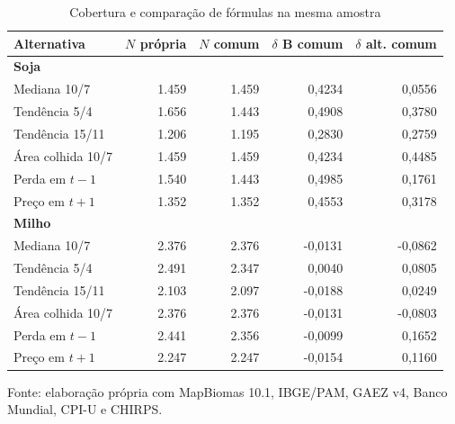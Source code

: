 \begin{table}[htbp]
\centering
\small
\setlength{\tabcolsep}{3pt}
\renewcommand{\arraystretch}{1.1}
\normalcaption\captionstyle{\centering}
\caption{Cobertura e comparação de fórmulas na mesma amostra}
\label{tab:h1-pontes}
\begin{tabular}{lrrrr}
\hline
Alternativa & $N$ própria & $N$ comum & $\delta$ B comum & $\delta$ alt. comum \\
\hline\multicolumn{5}{l}{\textbf{Soja}} \\
Mediana 10/7 & 1.459 & 1.459 & 0,4234 & 0,0556 \\
Tendência 5/4 & 1.656 & 1.443 & 0,4908 & 0,3780 \\
Tendência 15/11 & 1.206 & 1.195 & 0,2830 & 0,2759 \\
Área colhida 10/7 & 1.459 & 1.459 & 0,4234 & 0,4485 \\
Perda em $t-1$ & 1.540 & 1.443 & 0,4985 & 0,1761 \\
Preço em $t+1$ & 1.352 & 1.352 & 0,4553 & 0,3178 \\
\hline\multicolumn{5}{l}{\textbf{Milho}} \\
Mediana 10/7 & 2.376 & 2.376 & -0,0131 & -0,0862 \\
Tendência 5/4 & 2.491 & 2.347 & 0,0040 & 0,0805 \\
Tendência 15/11 & 2.103 & 2.097 & -0,0188 & 0,0249 \\
Área colhida 10/7 & 2.376 & 2.376 & -0,0131 & -0,0803 \\
Perda em $t-1$ & 2.441 & 2.356 & -0,0099 & 0,1652 \\
Preço em $t+1$ & 2.247 & 2.247 & -0,0154 & 0,1160 \\
\hline\end{tabular}
\par\smallskip
\begin{minipage}{\textwidth}\footnotesize\centering
Fonte: elaboração própria com MapBiomas 10.1, IBGE/PAM, GAEZ v4, Banco Mundial, CPI-U e CHIRPS.
\end{minipage}
\end{table}
